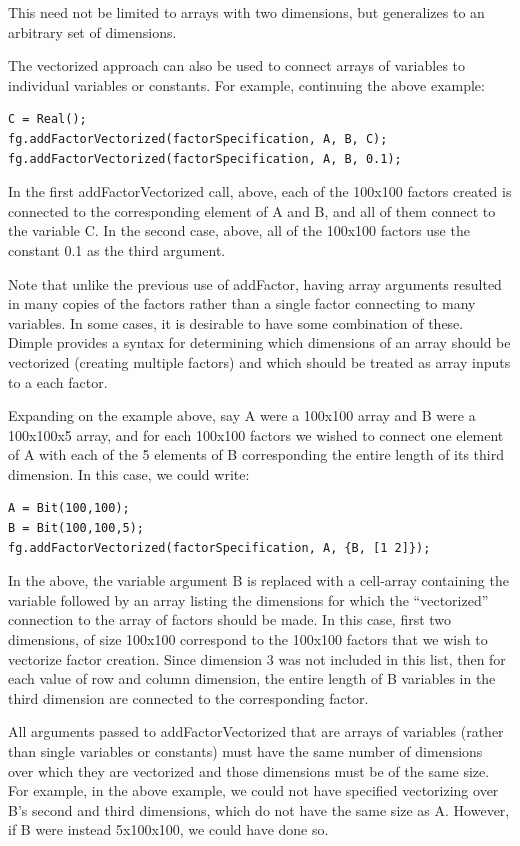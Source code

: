 This need not be limited to arrays with two dimensions, but generalizes to an arbitrary set of dimensions.

The vectorized approach can also be used to connect arrays of variables to individual variables or constants.  For example, continuing the above example:

\begin{lstlisting}
C = Real();
fg.addFactorVectorized(factorSpecification, A, B, C);
fg.addFactorVectorized(factorSpecification, A, B, 0.1);
\end{lstlisting}

In the first addFactorVectorized call, above, each of the 100x100 factors created is connected to the corresponding element of A and B, and all of them connect to the variable C.  In the second case, above, all of the 100x100 factors use the constant 0.1 as the third argument.

Note that unlike the previous use of addFactor, having array arguments resulted in many copies of the factors rather than a single factor connecting to many variables.  In some cases, it is desirable to have some combination of these.  Dimple provides a syntax for determining which dimensions of an array should be vectorized (creating multiple factors) and which should be treated as array inputs to a each factor.

Expanding on the example above, say A were a 100x100 array and B were a 100x100x5 array, and for each 100x100 factors we wished to connect one element of A with each of the 5 elements of B corresponding the entire length of its third dimension.  In this case, we could write:

\begin{lstlisting}
A = Bit(100,100);
B = Bit(100,100,5);
fg.addFactorVectorized(factorSpecification, A, {B, [1 2]});
\end{lstlisting}

In the above, the variable argument B is replaced with a cell-array containing the variable followed by an array listing the dimensions for which the ``vectorized'' connection to the array of factors should be made.  In this case, first two dimensions, of size 100x100 correspond to the 100x100 factors that we wish to vectorize factor creation.  Since dimension 3 was not included in this list, then for each value of row and column dimension, the entire length of B variables in the third dimension are connected to the corresponding factor.

All arguments passed to addFactorVectorized that are arrays of variables (rather than single variables or constants) must have the same number of dimensions over which they are vectorized and those dimensions must be of the same size.  For example, in the above example, we could not have specified vectorizing over B's second and third dimensions, which do not have the same size as A.  However, if B were instead 5x100x100, we could have done so.

